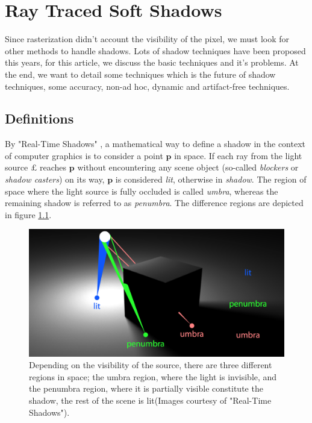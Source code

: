 \chapter{Ray Traced Soft Shadows}
Since rasterization didn't account the visibility of the pixel, we must look for other methods to handle shadows. Lots of shadow techniques have been proposed this years, for this article, we discuss the basic techniques and it's problems. At the end, we want to detail some techniques which is the future of shadow techniques, some accuracy, non-ad hoc, dynamic and artifact-free techniques. 

\section{Definitions}
By "Real-Time Shadows" \cite{b:rts}, a mathematical way to define a shadow in the context of computer graphics is to consider a point $\mathbf{p}$ in space. If each ray from the light source $\pounds$ reaches $\mathbf{p}$ without encountering any scene object (so-called \textit{blockers} or \textit{shadow casters}) on its way, $\mathbf{p}$ is considered \textit{lit}, otherwise in \textit{shadow}. The region of space where the light source is fully occluded is called \textit{umbra}, whereas the remaining shadow is referred to as \textit{penumbra}. The difference regions are depicted in figure \ref{f:shadow-definition}.

\begin{figure}\label{f:shadow-definition}
	\begin{center}
		\includegraphics[width=1.0\textwidth]{graphics/shadows/shadow-definition}
	\end{center}
	\caption{Depending on the visibility of the source, there are three different regions in space; the umbra region, where the light is invisible, and the penumbra region, where it is partially visible constitute the shadow, the rest of the scene is lit(Images courtesy of "Real-Time Shadows").}
\end{figure}

